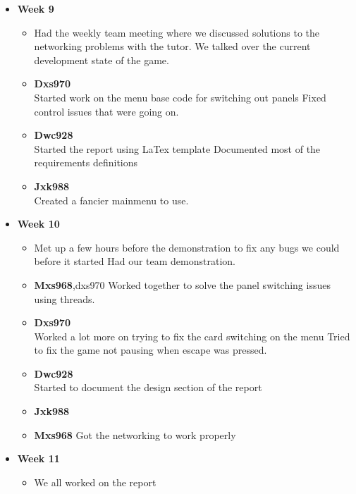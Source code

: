 \begin{itemize}
\item \textbf{Week 9}
  \begin{itemize}
  \item Had the weekly team meeting where we discussed solutions to
    the networking problems with the tutor.  We talked over the
    current development state of the game.
  \item \textbf{Dxs970}\\
    Started work on the menu base code for switching out panels Fixed
    control issues that were going on.
  \item \textbf{Dwc928}\\
    Started the report using LaTex template Documented most of the
    requirements definitions
  \item \textbf{Jxk988}\\
    Created a fancier mainmenu to use.
  \end{itemize}
\item \textbf{Week 10}
  \begin{itemize}
  \item Met up a few hours before the demonstration to fix any bugs we
    could before it started Had our team demonstration.
  \item \textbf{Mxs968},dxs970 Worked together to solve the panel
    switching issues using threads.
  \item \textbf{Dxs970}\\
    Worked a lot more on trying to fix the card switching on the menu
    Tried to fix the game not pausing when escape was pressed.
  \item \textbf{Dwc928}\\
    Started to document the design section of the report
  \item \textbf{Jxk988}\\
  \item \textbf{Mxs968} Got the networking to work properly
  \end{itemize}
\item \textbf{Week 11} 
  \begin{itemize}
  \item We all worked on the report
  \end{itemize}
\end{itemize}
